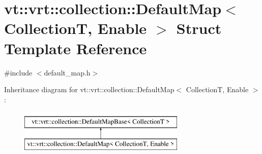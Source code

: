\hypertarget{structvt_1_1vrt_1_1collection_1_1_default_map}{}\section{vt\+:\+:vrt\+:\+:collection\+:\+:Default\+Map$<$ CollectionT, Enable $>$ Struct Template Reference}
\label{structvt_1_1vrt_1_1collection_1_1_default_map}


{\ttfamily \#include $<$default\+\_\+map.\+h$>$}

Inheritance diagram for vt\+:\+:vrt\+:\+:collection\+:\+:Default\+Map$<$ CollectionT, Enable $>$\+:\begin{figure}[H]
\begin{center}
\leavevmode
\includegraphics[height=2.000000cm]{structvt_1_1vrt_1_1collection_1_1_default_map}
\end{center}
\end{figure}
